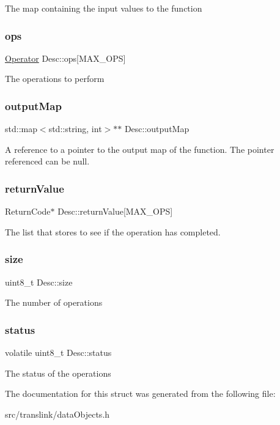 The map containing the input values to the function \mbox{\label{structDesc_a38e80352bf58db5502a73610210035d7}} 
\subsubsection{\texorpdfstring{ops}{ops}}
{\footnotesize\ttfamily \hyperlink{structOperator}{Operator} Desc\+::ops\mbox{[}M\+A\+X\+\_\+\+O\+PS\mbox{]}}

The operations to perform \mbox{\label{structDesc_a41ba9397b67c78e2a45e49859dcdfff0}} 
\subsubsection{\texorpdfstring{output\+Map}{outputMap}}
{\footnotesize\ttfamily std\+::map$<$std\+::string, int$>$$\ast$$\ast$ Desc\+::output\+Map}

A reference to a pointer to the output map of the function. The pointer referenced can be null. \mbox{\label{structDesc_aa3578181a26fc43b204648634e64546c}} 
\subsubsection{\texorpdfstring{return\+Value}{returnValue}}
{\footnotesize\ttfamily Return\+Code$\ast$ Desc\+::return\+Value\mbox{[}M\+A\+X\+\_\+\+O\+PS\mbox{]}}

The list that stores to see if the operation has completed. \mbox{\label{structDesc_a1a146b0ca2a38b593e7605d66eb95a18}} 
\subsubsection{\texorpdfstring{size}{size}}
{\footnotesize\ttfamily uint8\+\_\+t Desc\+::size}

The number of operations \mbox{\label{structDesc_a8ab3f25f43809ec536df5c68375010e2}} 
\subsubsection{\texorpdfstring{status}{status}}
{\footnotesize\ttfamily volatile uint8\+\_\+t Desc\+::status}

The status of the operations 

The documentation for this struct was generated from the following file\+:\begin{DoxyCompactItemize}
\item 
src/translink/data\+Objects.\+h\end{DoxyCompactItemize}
